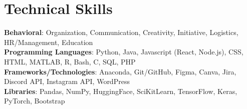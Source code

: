 \section{Technical Skills}
 \begin{itemize}[leftmargin=0.15in, label={}]
   \small{\item{
      \textbf{Behavioral}{: Organization, Communication, Creativity, Initiative, Logistics, HR/Management, Education} \\
      \textbf{Programming Languages}{: Python, Java, Javascript (React, Node.js), CSS, HTML, MATLAB, R, Bash, C, SQL, PHP} \\
      \textbf{Frameworks/Technologies}{: Anaconda, Git/GitHub, Figma, Canva, Jira, Discord API, Instagram API, WordPress} \\
      \textbf{Libraries}{: Pandas, NumPy, HuggingFace, SciKitLearn, TensorFlow, Keras, PyTorch, Bootstrap}
    }}
 \end{itemize}